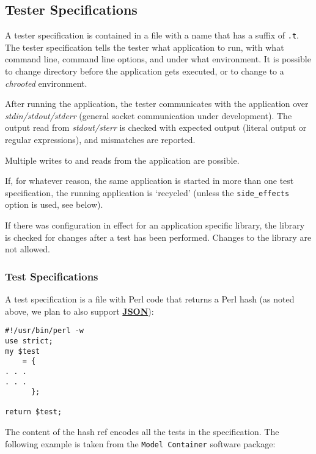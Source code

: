 \documentclass[12pt]{article}
\begin{document}
\subsection*{Tester Specifications}

A tester specification is contained in a file with a name that has a
suffix of {\tt .t}.  The tester specification tells the tester what
application to run, with what command line, command line options, and
under what environment.  It is possible to change directory before the
application gets executed, or to change to a {\it chrooted}
environment.

After running the application, the tester communicates with the application over {\it stdin/stdout/stderr} (general socket communication under development). The output read from {\it stdout/sterr} is checked with expected output (literal output or regular expressions), and mismatches are reported.

Multiple writes to and reads from the application are possible.

If, for whatever reason, the same application is started in more than one test specification, the running application is `recycled' (unless the {\tt side\_effects} option is used, see below).

If there was configuration in effect for an application specific library, the library is checked for changes after a test has been performed.  Changes to the library are not allowed.

\subsubsection*{Test Specifications}

A test specification is a file with Perl code that returns a Perl hash (as noted above, we plan to also support \href{http://www.json.org/}{\bf JSON}):

\begin{verbatim}
#!/usr/bin/perl -w
use strict;
my $test
    = {
. . .
. . . 
      };

return $test;

\end{verbatim}
The content of the hash ref encodes all the tests in the specification. The following example is taken from the {\tt Model Container} software package:
\end{document}
